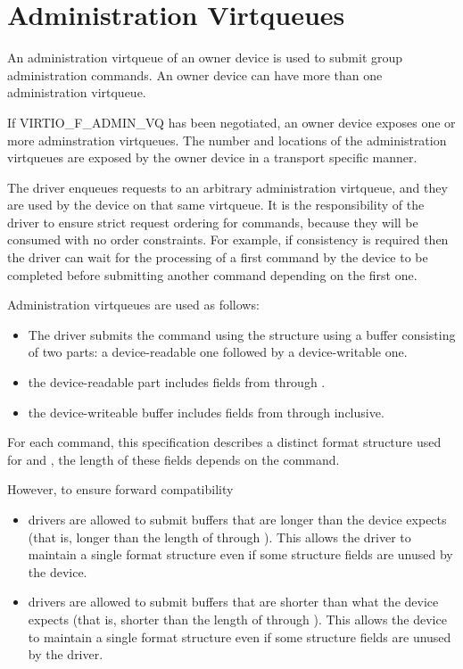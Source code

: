 \section{Administration Virtqueues}\label{sec:Basic Facilities of a Virtio Device / Administration Virtqueues}

An administration virtqueue of an owner device is used to submit
group administration commands. An owner device can have more
than one administration virtqueue.

If VIRTIO_F_ADMIN_VQ has been negotiated, an owner device exposes one
or more adminstration virtqueues. The number and locations of the
administration virtqueues are exposed by the owner device in a transport
specific manner.

The driver enqueues requests to an arbitrary administration
virtqueue, and they are used by the device on that same
virtqueue. It is the responsibility of the driver to ensure
strict request ordering for commands, because they will be
consumed with no order constraints.  For example, if consistency
is required then the driver can wait for the processing of a
first command by the device to be completed before submitting
another command depending on the first one.

Administration virtqueues are used as follows:
\begin{itemize}
\item The driver submits the command using the 
structure using a buffer consisting of two parts: a device-readable one followed by a
device-writable one.
\item the device-readable part includes fields from 
through .
\item the device-writeable buffer includes fields from 
through  inclusive.
\end{itemize}

For each command, this specification describes a distinct
format structure used for  and
, the length of these fields
depends on the command.

However, to ensure forward compatibility
\begin{itemize}
\item drivers are allowed to submit buffers that are longer
than the device expects
(that is, longer than the length of
 through ).
This allows the driver to maintain
a single format structure even if some structure fields are
unused by the device.
\item drivers are allowed to submit buffers that are shorter
than what the device expects
(that is, shorter than the length of  through
). This allows the device to maintain
a single format structure even if some structure fields are
unused by the driver.
\end{itemize}

